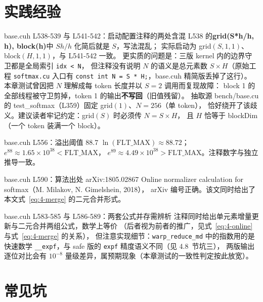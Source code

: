 \section{实践经验}

\begin{kaogu}[F3]{base.cuh L538-539 与 L541-542：启动配置注释的两处含混}
  L538 的\textbf{grid(S*h/h, h), block(h)}中 $S h / h$ 化简后就是 $S$，写法混乱；
  实际启动为 grid$(S,1,1)$、block$(H,1,1)$，与 L541-542 一致。
  更实质的问题是：三版 kernel 内的边界守卫都是全局索引 \texttt{idx < N}，
  但注释没有说明 $N$ 的语义是总元素数 $S \times H$（原始工程
  \texttt{softmax.cu} 入口有 \texttt{const int N = S * H;}，base.cuh 精简版丢掉了这行）。
  本章测试曾因把 $N$ 理解成每 token 长度并以 $S=2$ 调用而复现故障：
  block 1 的全部线程被守卫剪掉，token 1 的输出\textbf{不写回}（旧值残留）。
  抽取源 bench/base.cu 的 test\_softmax（L359）固定 grid$(1)$、$N = 256$（单 token），
  恰好绕开了该歧义。建议读者牢记约定：grid$(S)$ 时必须传 $N = S \times H$，
  且 $H$ 恰等于 blockDim（一个 token 装满一个 block）。
\end{kaogu}

\begin{kaogu}[F3 核校通过]{base.cuh L556：溢出阈值 88.7}
  $\ln(\mathrm{FLT\_MAX}) \approx 88.72$；$e^{88} \approx 1.65\times 10^{38} < \mathrm{FLT\_MAX}$，
  $e^{89} \approx 4.49\times 10^{38} > \mathrm{FLT\_MAX}$。注释数字与独立推导一致。
\end{kaogu}

\begin{kaogu}[F5 核校通过]{base.cuh L590：算法出处 arXiv:1805.02867}
  Online normalizer calculation for softmax（M. Milakov, N. Gimelshein, 2018），
  arXiv 编号正确。该文同时给出了本文式~\ref{eq:4-merge} 的二元合并形式。
\end{kaogu}

\begin{kaogu}[F3]{base.cuh L583-585 与 L586-589：两套公式并存需辨析}
  注释同时给出单元素增量更新与二元合并两组公式，数学上等价
  （后者视为前者的推广，见式~\ref{eq:4-online} 与式~\ref{eq:4-merge} 的关系），
  但注意实现细节：\texttt{warp\_\allowbreak{}reduce\_\allowbreak{}md} 中的指数用的是快速数学
  \texttt{\_\_expf}，与 safe 版的 \texttt{expf} 精度语义不同（见 4.8~节坑三），
  两版输出逐位对比会有 $10^{-8}$ 量级差异，属预期现象（本章测试的一致性判定按此放宽）。
\end{kaogu}

\section{常见坑}

